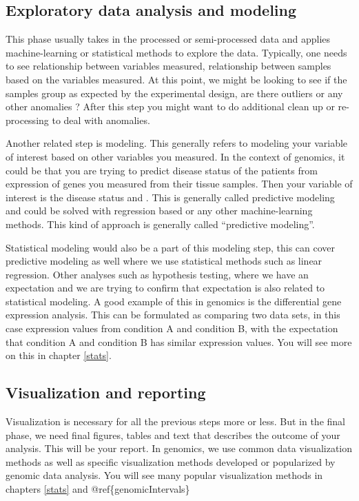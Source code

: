 \documentclass[12pt,]{krantz}
\begin{document}
\hypertarget{exploratory-data-analysis-and-modeling}{%
\subsection{Exploratory data analysis and modeling}\label{exploratory-data-analysis-and-modeling}}

This phase usually takes in the processed or semi-processed data and applies machine-learning or statistical methods to explore the data. Typically, one needs to see relationship between variables measured, relationship between samples based on the variables measured. At this point, we might be looking to see if the samples group as expected by the experimental design, are there outliers or any other anomalies ? After this step you might want to do additional clean up or re-processing to deal with anomalies.

Another related step is modeling. This generally refers to modeling your variable of interest based on other variables you measured. In the context of genomics, it could be that you are trying to predict disease status of the patients from expression of genes you measured from their tissue samples. Then your variable of interest is the disease status and . This is generally called predictive modeling and could be solved with regression based or any other machine-learning methods. This kind of approach is generally called ``predictive modeling''.

Statistical modeling would also be a part of this modeling step, this can cover predictive modeling as well where we use statistical methods such as linear regression. Other analyses such as hypothesis testing, where we have an expectation and we are trying to confirm that expectation is also related to statistical modeling. A good example of this in genomics is the differential gene expression analysis. This can be formulated as comparing two data sets, in this case expression values from condition A and condition B, with the expectation that condition A and condition B has similar expression values. You will see more on this in chapter \ref{stats}.

\hypertarget{visualization-and-reporting}{%
\subsection{Visualization and reporting}\label{visualization-and-reporting}}

Visualization is necessary for all the previous steps more or less. But in the final phase, we need final figures, tables and text that describes the outcome of your analysis. This will be your report. In genomics, we use common data visualization methods as well as specific visualization methods developed or popularized by genomic data analysis. You will see many popular visualization methods in chapters \ref{stats} and @ref\{genomicIntervals\}
\end{document}
